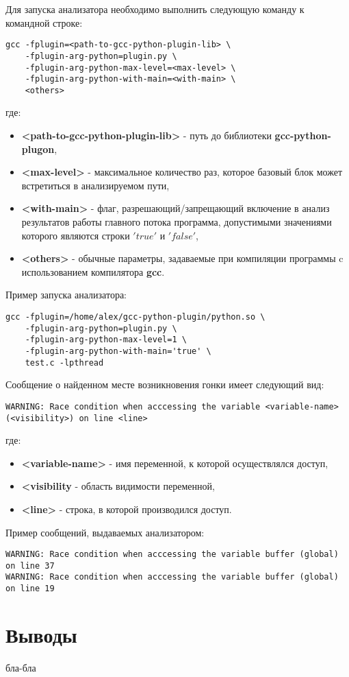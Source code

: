 Для запуска анализатора необходимо выполнить следующую команду к командной строке:
\begin{verbatim}
gcc -fplugin=<path-to-gcc-python-plugin-lib> \
    -fplugin-arg-python=plugin.py \
    -fplugin-arg-python-max-level=<max-level> \
    -fplugin-arg-python-with-main=<with-main> \
    <others>
\end{verbatim}
где:
\begin{itemize}
  \item \textbf{<path-to-gcc-python-plugin-lib>} - путь до библиотеки \textbf{gcc-python-plugon},
  \item \textbf{<max-level>} - максимальное количество раз, которое базовый блок может встретиться в анализируемом пути,
  \item \textbf{<with-main>} - флаг, разрешающий/запрещающий включение в анализ результатов работы главного потока программа, допустимыми значениями которого являются строки $'true'$ и $'false'$,
  \item \textbf{<others>} - обычные параметры, задаваемые при компиляции программы c использованием компилятора \textbf{gcc}.
\end{itemize}

Пример запуска анализатора:
\begin{verbatim}
gcc -fplugin=/home/alex/gcc-python-plugin/python.so \
    -fplugin-arg-python=plugin.py \
    -fplugin-arg-python-max-level=1 \
    -fplugin-arg-python-with-main='true' \
    test.c -lpthread
\end{verbatim}

Сообщение о найденном месте возникновения гонки имеет следующий вид:
\begin{verbatim}
WARNING: Race condition when acccessing the variable <variable-name> (<visibility>) on line <line>
\end{verbatim}
где:
\begin{itemize}
  \item \textbf{<variable-name>} - имя переменной, к которой осуществлялся доступ,
  \item \textbf{<visibility} - область видимости переменной,
  \item \textbf{<line>} - строка, в которой производился доступ.
\end{itemize}

Пример сообщений, выдаваемых анализатором:
\begin{verbatim}
WARNING: Race condition when acccessing the variable buffer (global) on line 37
WARNING: Race condition when acccessing the variable buffer (global) on line 19
\end{verbatim}

\section{Выводы}

бла-бла
